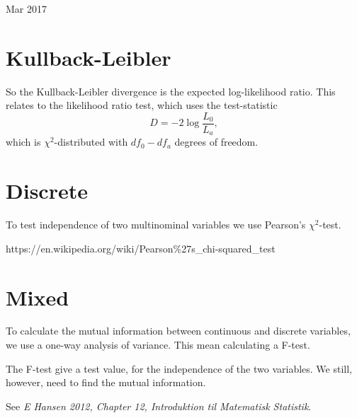 \documentclass[12pt]{article}
\begin{document}
{\Large Mar 2017}
\section{Kullback-Leibler}
So the Kullback-Leibler divergence is the expected log-likelihood ratio.
This relates to the likelihood ratio test, which uses the test-statistic
$$ D = - 2 \log \frac{L_0}{L_a},$$
which is $\chi^2$-distributed with $df_0 - df_a$ degrees of freedom.

\section{Discrete}
To test independence of two multinominal variables we use Pearson's $\chi^2$-test. 

https://en.wikipedia.org/wiki/Pearson\%27s\_chi-squared\_test

\section{Mixed}
To calculate the mutual information between continuous and discrete variables, we use a one-way analysis of variance. This mean calculating a F-test. 

The F-test give a test value, for the independence of the two variables. We still, however, need to find the mutual information.

See \emph{E Hansen 2012, Chapter 12, Introduktion til Matematisk Statistik}.
\end{document}
